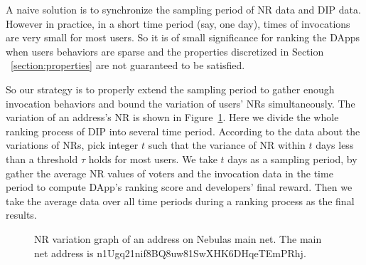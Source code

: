   A naive solution is to synchronize the sampling period of NR data and DIP data. However in practice, in a short time period (say, one day), times of invocations are very small for most users. So it is of small significance for ranking the DApps when users behaviors are sparse and the properties discretized  in Section ~\ref{section:properties} are not guaranteed to be satisfied.
  
  So our strategy is to properly extend the sampling period to gather enough invocation behaviors and bound the variation of users' NRs simultaneously. The variation of  an address's NR is shown in Figure~\ref{fig:nr}. Here we divide the whole ranking process of DIP into several time period. According to the data about the variations of NRs, pick integer $t$ such that the variance of NR within $t$ days less than a threshold $\tau$ holds for most users. We take $t$ days as a sampling period, by gather the average NR values of voters and the invocation data in the time period to compute DApp's ranking score and developers' final reward. Then we take the average data over all time periods during a ranking process as the final  results. 
  
  \begin{figure}
  	\label{fig:nr}
  	\centering
  	
  	\caption{NR variation graph of an address on Nebulas main net. The main net address is n1Ugq21nif8BQ8uw81SwXHK6DHqeTEmPRhj.}
  \end{figure}
  


